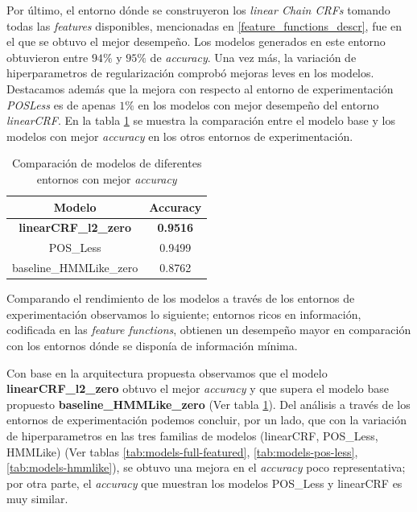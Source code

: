 \documentclass[letterpaper,12pt,oneside]{book}
\theoremstyle{definition}
\begin{document}
Por último, el entorno dónde se construyeron los \textit{linear Chain CRFs} tomando todas las \textit{features} disponibles, mencionadas en \ref{feature_functions_descr}, fue en el que se obtuvo el mejor desempeño. Los modelos generados en este entorno obtuvieron entre $94\%$ y $95\%$ de \textit{accuracy}. Una vez más, la variación de hiperparametros de regularización comprobó mejoras leves en los modelos. Destacamos además que la mejora con respecto al entorno de experimentación \textit{POSLess} es de apenas $1\%$ en los modelos con mejor desempeño del entorno \textit{linearCRF}. En la tabla \ref{tab:models-comparation} se muestra la comparación entre el modelo base y los modelos con mejor \textit{accuracy} en los otros entornos de experimentación.

\begin{table}[ht]
    \centering
    \begin{tabular}{| c | c |}\hline
        \textbf{Modelo} & \textbf{Accuracy} \\\hline
        \textbf{\textsf{linearCRF\_l2\_zero}} & \textbf{0.9516}\\ 
        \textsf{POS\_Less} & 0.9499\\ 
        \textsf{baseline\_HMMLike\_zero} & 0.8762\\ \hline
    \end{tabular}
    \caption{Comparación de modelos de diferentes entornos con mejor \textit{accuracy}}
    \label{tab:models-comparation}
\end{table}  

Comparando el rendimiento de los modelos a través de los entornos de experimentación observamos lo siguiente; entornos ricos en información, codificada en las \textit{feature functions}, obtienen un desempeño mayor en comparación con los entornos dónde se disponía de información mínima.

Con base en la arquitectura propuesta observamos que el modelo  \textbf{\textsf{linearCRF\_l2\_zero}} obtuvo el mejor \textit{accuracy} y que supera el modelo base propuesto \textbf{\textsf{baseline\_HMMLike\_zero}} (Ver tabla \ref{tab:models-comparation}). Del análisis a través de los entornos de experimentación podemos concluir, por un lado, que con la variación de hiperparametros en las tres familias de modelos (\textsf{linearCRF}, \textsf{POS\_Less}, \textsf{HMMLike}) (Ver tablas \ref{tab:models-full-featured}, \ref{tab:models-pos-less}, \ref{tab:models-hmmlike}), se obtuvo una mejora en el \textit{accuracy} poco representativa; por otra parte, el \textit{accuracy} que muestran los modelos \textsf{POS\_Less} y \textsf{linearCRF} es muy similar.
\end{document}
